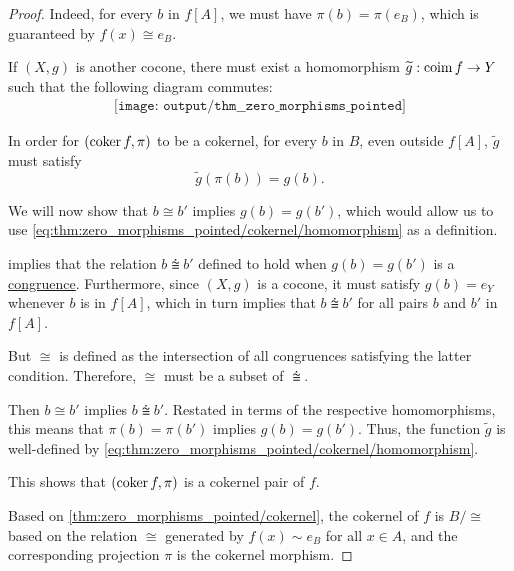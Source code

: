 \begin{proof}
  Indeed, for every \( b \) in \( f[A] \), we must have \( \pi(b) = \pi(e_B) \), which is guaranteed by \( f(x) \cong e_B \).

   If \( (X, g) \) is another cocone, there must exist a homomorphism \( \widetilde g: \operatorname*{co\negthinspace\operatorname{im}} f \to Y \) such that the following diagram commutes:
  \begin{equation*}
    \begin{aligned}
      \texttt{[image: output/thm\_\_zero\_morphisms\_pointed]}
    \end{aligned}
  \end{equation*}

  In order for \( (\operatorname*{co\negthinspace\ker} f, \pi) \) to be a cokernel, for every \( b \) in \( B \), even outside \( f[A] \), \( \widetilde g \) must satisfy
  \begin{equation}\label{eq:thm:zero_morphisms_pointed/cokernel/homomorphism}
    \widetilde{g}(\pi(b)) = g(b).
  \end{equation}

  We will now show that \( b \cong b' \) implies \( g(b) = g(b') \), which would allow us to use \eqref{eq:thm:zero_morphisms_pointed/cokernel/homomorphism} as a definition.

   implies that the relation \( b \congdot b' \) defined to hold when \( g(b) = g(b') \) is a \hyperref[def:first_order_congruence]{congruence}. Furthermore, since \( (X, g) \) is a cocone, it must satisfy \( g(b) = e_Y \) whenever \( b \) is in \( f[A] \), which in turn implies that \( b \congdot b' \) for all pairs \( b \) and \( b' \) in \( f[A] \).

  But \( {\cong} \) is defined as the intersection of all congruences satisfying the latter condition. Therefore, \( {\cong} \) must be a subset of \( {\congdot} \).

  Then \( b \cong b' \) implies \( b \congdot b' \). Restated in terms of the respective homomorphisms, this means that \( \pi(b) = \pi(b') \) implies \( g(b) = g(b') \). Thus, the function \( \widetilde{g} \) is well-defined by \eqref{eq:thm:zero_morphisms_pointed/cokernel/homomorphism}.

  This shows that \( (\operatorname*{co\negthinspace\ker} f, \pi) \) is a cokernel pair of \( f \).

   Based on \cref{thm:zero_morphisms_pointed/cokernel}, the cokernel of \( f \) is \( B / {\cong} \) based on the relation \( {\cong} \) generated by \( f(x) \sim e_B \) for all \( x \in A \), and the corresponding projection \( \pi \) is the cokernel morphism.


\end{proof}
